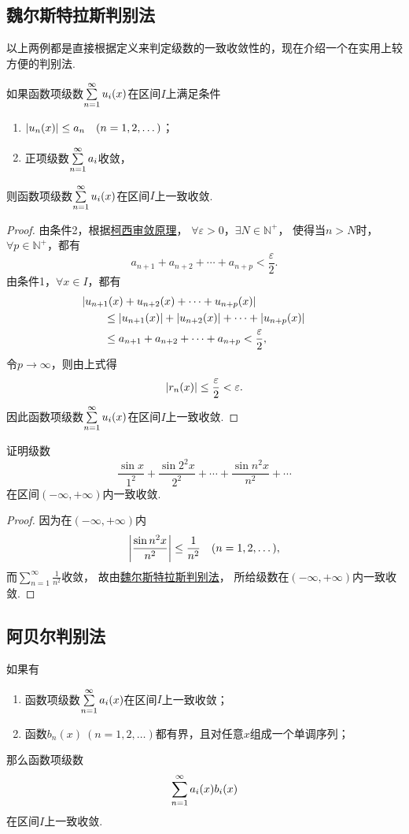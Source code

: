 \subsection{魏尔斯特拉斯判别法}
以上两例都是直接根据定义来判定级数的一致收敛性的，现在介绍一个在实用上较方便的判别法.
\begin{theorem}[魏尔斯特拉斯判别法]\label{theorem:无穷级数.魏尔斯特拉斯判别法}
如果函数项级数\(\sum\limits_{n=1}^\infty u_i(x)\)在区间\(I\)上满足条件\begin{enumerate}
\item \(\abs{u_n(x)} \leq a_n \quad(n=1,2,\dotsc)\)；
\item 正项级数\(\sum\limits_{n=1}^\infty a_i\)收敛，%
\end{enumerate}
则函数项级数\(\sum\limits_{n=1}^\infty u_i(x)\)在区间\(I\)上一致收敛.
\begin{proof}
由条件2，根据\hyperref[theorem:无穷级数.级数的柯西审敛原理]{柯西审敛原理}，%
\(\forall\varepsilon>0\)，\(\exists N \in \mathbb{N}^+\)，%
使得当\(n > N\)时，\(\forall p \in \mathbb{N}^+\)，都有\[
a_{n+1} + a_{n+2} + \dotsb + a_{n+p} < \frac{\varepsilon}{2}.
\]由条件1，\(\forall x \in I\)，都有\begin{align*}
&\hspace{-20pt}\abs{u_{n+1}(x) + u_{n+2}(x) + \dotsb + u_{n+p}(x)} \\
&\leq \abs{u_{n+1}(x)} + \abs{u_{n+2}(x)} + \dotsb + \abs{u_{n+p}(x)} \\
&\leq a_{n+1} + a_{n+2} + \dotsb + a_{n+p} < \frac{\varepsilon}{2},
\end{align*}令\(p\to\infty\)，则由上式得\[
\abs{r_n(x)} \leq \frac{\varepsilon}{2} < \varepsilon.
\]因此函数项级数\(\sum\limits_{n=1}^\infty u_i(x)\)在区间\(I\)上一致收敛.
\end{proof}
\end{theorem}

\begin{example}
证明级数\[
\frac{\sin x}{1^2}
+ \frac{\sin 2^2 x}{2^2}
+ \dotsb
+ \frac{\sin n^2 x}{n^2}
+ \dotsb
\]在区间\((-\infty,+\infty)\)内一致收敛.
\begin{proof}
因为在\((-\infty,+\infty)\)内\[
\abs{\frac{\sin n^2 x}{n^2}} \leq \frac{1}{n^2}
\quad(n=1,2,\dotsc),
\]而\(\sum\limits_{n=1}^\infty \frac{1}{n^2}\)收敛，%
故由\hyperref[theorem:无穷级数.魏尔斯特拉斯判别法]{魏尔斯特拉斯判别法}，%
所给级数在\((-\infty,+\infty)\)内一致收敛.
\end{proof}
\end{example}

\subsection{阿贝尔判别法}
\begin{theorem}[阿贝尔判别法]\label{theorem:无穷级数.阿贝尔判别法}
如果有
\begin{enumerate}
\item 函数项级数\(\sum\limits_{n=1}^\infty a_i(x)\)在区间\(I\)上一致收敛；
\item 函数\(b_n(x)\ (n=1,2,\dotsc)\)都有界，且对任意\(x\)组成一个单调序列；
\end{enumerate}
那么函数项级数\[
\sum\limits_{n=1}^\infty a_i(x) b_i(x)
\]
在区间\(I\)上一致收敛.
\end{theorem}

